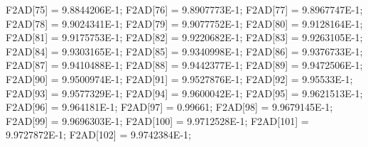 \begin{code}
\begin{hide}
{      F2AD[75] = 9.8844206E-1;
      F2AD[76] = 9.8907773E-1;
      F2AD[77] = 9.8967747E-1;
      F2AD[78] = 9.9024341E-1;
      F2AD[79] = 9.9077752E-1;
      F2AD[80] = 9.9128164E-1;
      F2AD[81] = 9.9175753E-1;
      F2AD[82] = 9.9220682E-1;
      F2AD[83] = 9.9263105E-1;
      F2AD[84] = 9.9303165E-1;
      F2AD[85] = 9.9340998E-1;
      F2AD[86] = 9.9376733E-1;
      F2AD[87] = 9.9410488E-1;
      F2AD[88] = 9.9442377E-1;
      F2AD[89] = 9.9472506E-1;
      F2AD[90] = 9.9500974E-1;
      F2AD[91] = 9.9527876E-1;
      F2AD[92] = 9.95533E-1;
      F2AD[93] = 9.9577329E-1;
      F2AD[94] = 9.9600042E-1;
      F2AD[95] = 9.9621513E-1;
      F2AD[96] = 9.964181E-1;
      F2AD[97] = 0.99661;
      F2AD[98] = 9.9679145E-1;
      F2AD[99] = 9.9696303E-1;
      F2AD[100] = 9.9712528E-1;
      F2AD[101] = 9.9727872E-1;
      F2AD[102] = 9.9742384E-1;

}
\end{hide}
\end{code}
